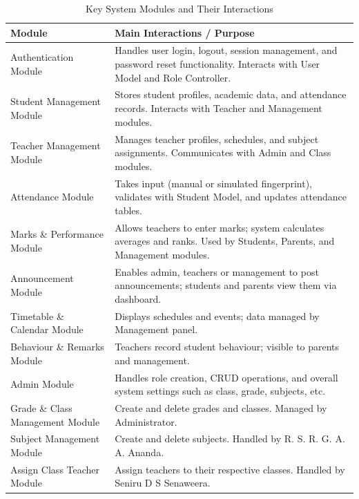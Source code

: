 \documentclass[12pt, a4paper]{report}
\begin{document}
\begin{table}[H]
\centering
\caption{Key System Modules and Their Interactions}
\label{tab:modules}
\begin{tabularx}{\textwidth}{l X}
\toprule
\textbf{Module} & \textbf{Main Interactions / Purpose} \\
\midrule
Authentication Module & Handles user login, logout, session management, and password reset functionality. Interacts with User Model and Role Controller. \\
\addlinespace
Student Management Module & Stores student profiles, academic data, and attendance records. Interacts with Teacher and Management modules. \\
\addlinespace
Teacher Management Module & Manages teacher profiles, schedules, and subject assignments. Communicates with Admin and Class modules. \\
\addlinespace
Attendance Module & Takes input (manual or simulated fingerprint), validates with Student Model, and updates attendance tables. \\
\addlinespace
Marks \& Performance Module & Allows teachers to enter marks; system calculates averages and ranks. Used by Students, Parents, and Management modules. \\
\addlinespace
Announcement Module & Enables admin, teachers or management to post announcements; students and parents view them via dashboard. \\
\addlinespace
Timetable \& Calendar Module & Displays schedules and events; data managed by Management panel. \\
\addlinespace
Behaviour \& Remarks Module & Teachers record student behaviour; visible to parents and management. \\
\addlinespace
Admin Module & Handles role creation, CRUD operations, and overall system settings such as class, grade, subjects, etc. \\
\addlinespace
Grade \& Class Management Module & Create and delete grades and classes. Managed by Administrator. \\
\addlinespace
Subject Management Module & Create and delete subjects. Handled by R. S. R. G. A. A. Ananda. \\
\addlinespace
Assign Class Teacher Module & Assign teachers to their respective classes. Handled by Seniru D S Senaweera. \\
\bottomrule
\end{tabularx}
\end{table}
\end{document}
